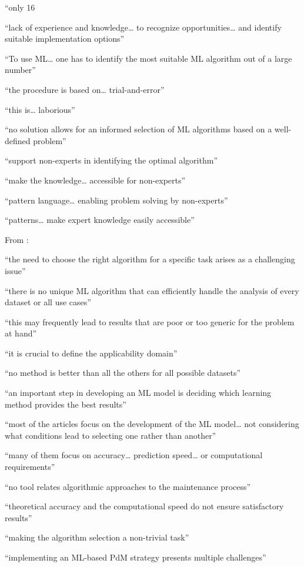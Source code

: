 “only 16%

“lack of experience and knowledge… to recognize opportunities… and identify suitable implementation options”

“To use ML… one has to identify the most suitable ML algorithm out of a large number”

“the procedure is based on… trial-and-error”

“this is… laborious”

“no solution allows for an informed selection of ML algorithms based on a well-defined problem”

“support non-experts in identifying the optimal algorithm”

“make the knowledge… accessible for non-experts”

“pattern language… enabling problem solving by non-experts”

“patterns… make expert knowledge easily accessible”

From \parencite{arena2024conceptual_framework_ml_algorithm_selection_predictive_maintenance} :

“the need to choose the right algorithm for a specific task arises as a challenging issue”

“there is no unique ML algorithm that can efficiently handle the analysis of every dataset or all use cases”

“this may frequently lead to results that are poor or too generic for the problem at hand”

“it is crucial to define the applicability domain”

“no method is better than all the others for all possible datasets”

“an important step in developing an ML model is deciding which learning method provides the best results”

“most of the articles focus on the development of the ML model… not considering what conditions lead to selecting one rather than another”

“many of them focus on accuracy… prediction speed… or computational requirements”

“no tool relates algorithmic approaches to the maintenance process”

“theoretical accuracy and the computational speed do not ensure satisfactory results”

“making the algorithm selection a non-trivial task”

“implementing an ML-based PdM strategy presents multiple challenges”

